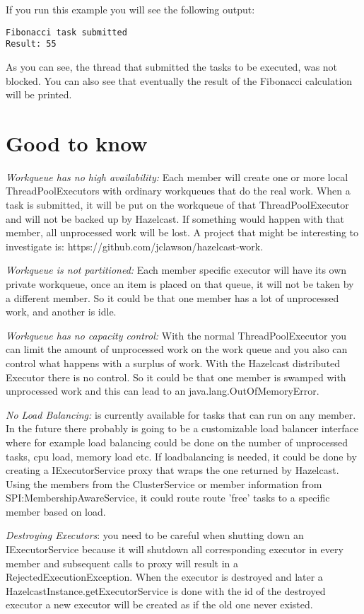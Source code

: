 If you run this example you will see the following output:
\begin{lstlisting}
Fibonacci task submitted
Result: 55
\end{lstlisting}
As you can see, the thread that submitted the tasks to be executed, was not blocked. You can also see that eventually the result of the Fibonacci calculation will be printed. 

\section{Good to know}

\emph{Workqueue has no high availability:} Each member will create one or more local ThreadPoolExecutors with ordinary workqueues that do the real work. When a task is submitted, it will be put on the workqueue of that ThreadPoolExecutor and will not be backed up by Hazelcast. If something would happen with that member, all unprocessed work will be lost. A project that might be interesting to investigate is: https://github.com/jclawson/hazelcast-work.

\emph{Workqueue is not partitioned:} Each member specific executor will have its own private workqueue, once an item is placed on that queue, it will not be taken by a different member. So it could be that one member has a lot of unprocessed work, and another is idle.

\emph{Workqueue has no capacity control:} With the normal ThreadPoolExecutor you can limit the amount of unprocessed work on the work queue and you also can control what happens with a surplus of work. With the Hazelcast distributed Executor there is no control. So it could be that one member is swamped with unprocessed work and this can lead to an java.lang.OutOfMemoryError. 

\emph{No Load Balancing:} is currently available for tasks that can run on any member. In the future there probably is going to be a customizable load balancer interface where for example load balancing could be done on the number of unprocessed tasks, cpu load, memory load etc. If loadbalancing is needed, it could be done by creating a IExecutorService proxy that wraps the one returned by Hazelcast. Using the members from the ClusterService or  member information from SPI:MembershipAwareService, it could route route 'free' tasks to a specific member based on load.

\emph{Destroying Executors}: you need to be careful when shutting down an IExecutorService because it will shutdown all corresponding executor in every member and subsequent calls to proxy will result in a RejectedExecutionException. When the executor is destroyed and later a HazelcastInstance.getExecutorService is done with the id of the destroyed executor a new executor will be created as if the old one never existed.

